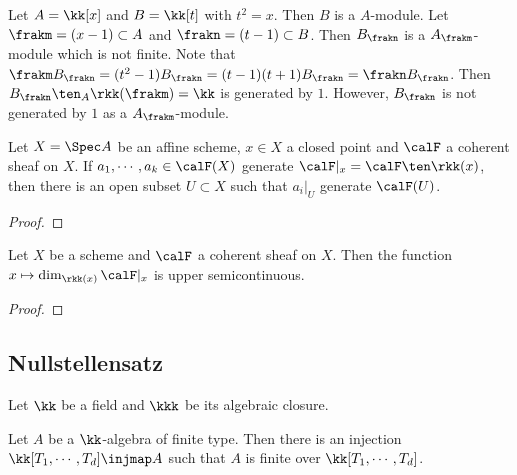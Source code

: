     \begin{example}\label{eg:counterexample_of_Nakayama's_lemma_localization}
        Let \(A = \kk[x]\) and \(B = \kk[t]\) with \(t^2 = x\).
        Then \(B\) is a \(A\)-module.
        Let \(\frakm = (x-1) \subset A\) and \(\frakn = (t-1) \subset B\).
        Then \(B_\frakn\) is a \(A_\frakm\)-module which is not finite.
        Note that \(\frakm B_\frakn = (t^2-1)B_\frakn = (t-1)(t+1)B_\frakn = \frakn B_\frakn\).
        Then \(B_\frakn \ten_A \rkk(\frakm) = \kk\) is generated by \(1\).
        However, \(B_\frakn\) is not generated by \(1\) as a \(A_\frakm\)-module.
    \end{example}

    \begin{proposition}\label{prop: geometric form of Nakayama's lemma}
        Let $X = \Spec A$ be an affine scheme, $x\in X$ a closed point and $\calF$ a coherent sheaf on $X$.
        If $a_1,\cdots,a_k \in \calF(X)$ generate $\calF|_x = \calF \ten \rkk(x)$, then there is an open subset $U \subset X$ such that $a_i|_U$ generate $\calF(U)$. 
    \end{proposition}
    \begin{proof}
    \end{proof}

    \begin{corollary}\label{cor: upper semicontinuity of dimension of restriction of coherent sheaf to fiber}
        Let \(X\) be a scheme and \(\calF\) a coherent sheaf on \(X\).
        Then the function \(x \mapsto \dim_{\rkk(x)} \calF|_x\) is upper semicontinuous.
    \end{corollary}
    \begin{proof}
    \end{proof}

\subsection{Nullstellensatz}

    Let \(\kk\) be a field and \(\kkk\) be its algebraic closure.

    \begin{theorem}\label{thm: Noether's Normalization Lemma}
        Let $A$ be a $\kk$-algebra of finite type.
        Then there is an injection $\kk[T_1,\cdots,T_d] \injmap A$ such that $A$ is finite over $\kk[T_1,\cdots,T_d]$.
    \end{theorem}

